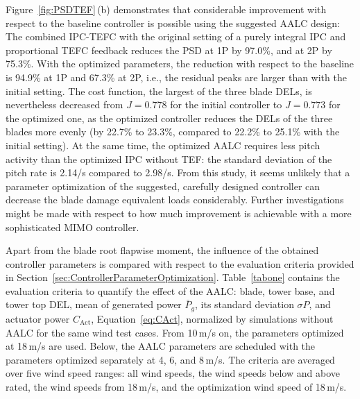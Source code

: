 Figure~\ref{fig:PSDTEF}\,(b) demonstrates that considerable improvement with respect to the baseline controller is possible using the suggested AALC design: The combined IPC-TEFC with the original setting of a purely integral IPC and proportional TEFC feedback reduces the PSD at 1P by 97.0\%, and at 2P by 75.3\%. With the optimized parameters, the reduction with respect to the baseline is 94.9\% at 1P and 67.3\% at 2P, i.e., the residual peaks are larger than with the initial setting. The cost function, the largest of the three blade DELs, is nevertheless decreased from $J = 0.778$ for the initial controller to $J = 0.773$ for the optimized one, as the optimized controller reduces the DELs of the three blades more evenly (by 22.7\% to 23.3\%, compared to 22.2\% to 25.1\% with the initial setting). At the same time, the optimized AALC requires less pitch activity than the optimized IPC without TEF: the standard deviation of the pitch rate is 2.14\textdegree/s compared to 2.98\textdegree/s.
From this study, it seems unlikely that a parameter optimization of the suggested, carefully designed controller can decrease the blade damage equivalent loads considerably. Further investigations might be made with respect to how much improvement is achievable with a more sophisticated MIMO controller.

Apart from the blade root flapwise moment, the influence of the obtained controller parameters is compared with respect to the evaluation criteria provided in Section~\ref{sec:ControllerParameterOptimization}.
%
Table~\ref{tabone} contains the evaluation criteria to quantify the effect of the AALC: blade, tower base, and tower top DEL, mean of generated power $\bar{P}_{g}$, its standard deviation $\sigma P$, and actuator power $C_{\text{Act}}$, Equation~\eqref{eq:CAct}, normalized by simulations without AALC for the same wind test cases. From 10\,m/s on, the parameters optimized at 18\,m/s are used. Below, the AALC parameters are scheduled with the parameters optimized separately at 4, 6, and 8\,m/s. The criteria are averaged over five wind speed ranges: all wind speeds, the wind speeds below and above rated, the wind speeds from 18\,m/s, and the optimization wind speed of 18\,m/s.


